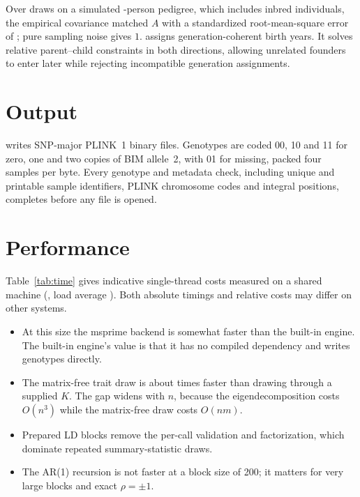 \documentclass[11pt,a4paper]{article}
\begin{document}
Over \PhPedDraws{} draws on a simulated \PhPedN-person pedigree, which
includes inbred individuals, the empirical covariance matched $A$ with a
standardized root-mean-square error of \PhPedRms{}; pure sampling noise
gives $1$.  assigns generation-coherent birth
years. It solves relative parent--child constraints in both directions,
allowing unrelated founders to enter later while rejecting incompatible
generation assignments.

\section{Output}
 writes SNP-major PLINK~1 binary files. Genotypes are
coded 00, 10 and 11 for zero, one and two copies of BIM allele~2, with 01
for missing, packed four samples per byte. Every genotype and metadata
check, including unique and printable sample identifiers, PLINK chromosome
codes and integral positions, completes before any file is opened.

\section{Performance}
Table~\ref{tab:time} gives indicative single-thread costs measured on a
shared machine (\PhMachine, load average \PhLoad). Both absolute timings
and relative costs may differ on other systems.
\begin{itemize}
\item At this size the msprime backend is somewhat faster than the
  built-in engine. The built-in engine's value is that it has no compiled
  dependency and writes genotypes directly.
\item The matrix-free trait draw is about \PhTraitSpeedup{} times faster
  than drawing through a supplied $K$. The gap widens with $n$, because the
  eigendecomposition costs $O(n^3)$ while the matrix-free draw costs $O(nm)$.
\item Prepared LD blocks remove the per-call validation and factorization,
  which dominate repeated summary-statistic draws.
\item The AR(1) recursion is not faster at a block size of 200; it
  matters for very large blocks and exact $\rho=\pm1$.
\end{itemize}

\begin{table}[ht]\centering\small
\caption{Indicative wall-clock cost, median of three runs after a warm-up,
BLAS pinned to one thread.}\label{tab:time}

\end{table}
\end{document}
